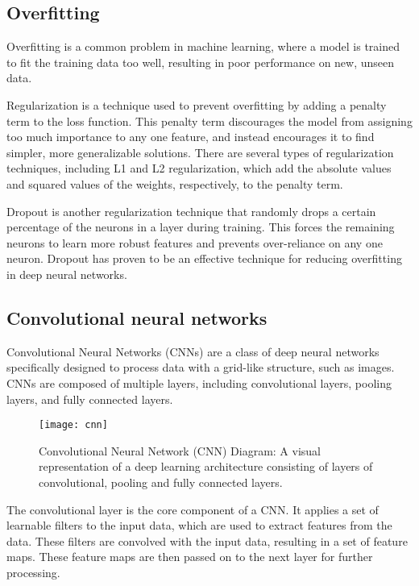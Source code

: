 \subsection{Overfitting}
Overfitting is a common problem in machine learning, where a model is trained to fit the training data too well, resulting in poor performance on new, unseen data.

Regularization is a technique used to prevent overfitting by adding a penalty term to the loss function.
This penalty term discourages the model from assigning too much importance to any one feature, and instead encourages it to find simpler, more generalizable solutions.
There are several types of regularization techniques, including L1 and L2 regularization, which add the absolute values and squared values of the weights, respectively, to the penalty term.

Dropout is another regularization technique that randomly drops a certain percentage of the neurons in a layer during training. 
This forces the remaining neurons to learn more robust features and prevents over-reliance on any one neuron. 
Dropout has proven to be an effective technique for reducing overfitting in deep neural networks.



\subsection{Convolutional neural networks}
Convolutional Neural Networks (CNNs) \cite{goodfellow2016deep} are a class of deep neural networks specifically designed to process data with a grid-like structure, such as images.
CNNs are composed of multiple layers, including convolutional layers, pooling layers, and fully connected layers.


\begin{figure}[H]
  \centering
  \texttt{[image: cnn]}
  \caption{Convolutional Neural Network (CNN) Diagram: A visual representation of a deep learning architecture consisting of layers of convolutional, pooling and fully connected layers. \cite{shah}}
\end{figure}

The convolutional layer is the core component of a CNN.
It applies a set of learnable filters to the input data, which are used to extract features from the data.
These filters are convolved with the input data, resulting in a set of feature maps.
These feature maps are then passed on to the next layer for further processing.

